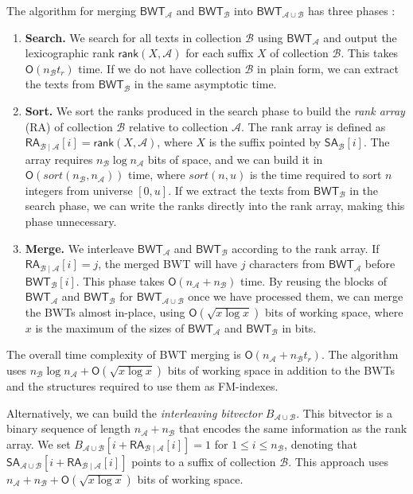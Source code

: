 \documentclass[smallabstract,smallcaptions]{dccpaper}
\newcommand{\Oh}{\ensuremath{\mathsf{O}}}
\newcommand{\BWT}{\textsf{BWT}}
\newcommand{\RA}{\textsf{RA}}
\newcommand{\mSA}{\ensuremath{\mathsf{SA}}}
\newcommand{\mBWT}{\ensuremath{\mathsf{BWT}}}
\newcommand{\mRA}{\ensuremath{\mathsf{RA}}}
\newcommand{\mrank}{\ensuremath{\mathsf{rank}}}
\newcommand{\Acoll}{\ensuremath{\mathcal{A}}}
\newcommand{\Bcoll}{\ensuremath{\mathcal{B}}}
\begin{document}
The algorithm for merging $\mBWT_{\Acoll}$ and $\mBWT_{\Bcoll}$ into $\mBWT_{\Acoll \cup \Bcoll}$ has three phases \cite{Siren2009}:
\begin{enumerate}

\item \textbf{Search.} We search for all texts in collection $\Bcoll$ using $\mBWT_{\Acoll}$ and output the lexicographic rank $\mrank(X, \Acoll)$ for each suffix $X$ of collection $\Bcoll$. This takes $\Oh(n_{\Bcoll} t_{r})$ time. If we do not have collection $\Bcoll$ in plain form, we can extract the texts from $\mBWT_{\Bcoll}$ in the same asymptotic time.

\item \textbf{Sort.} We sort the ranks produced in the search phase to build the \emph{rank array} (\RA) of collection $\Bcoll$ relative to collection $\Acoll$. The rank array is defined as $\mRA_{\Bcoll \mid \Acoll}[i] = \mrank(X, \Acoll)$, where $X$ is the suffix pointed by $\mSA_{\Bcoll}[i]$. The array requires $n_{\Bcoll} \log n_{\Acoll}$ bits of space, and we can build it in $\Oh(sort(n_{\Bcoll}, n_{\Acoll}))$ time, where $sort(n, u)$ is the time required to sort $n$ integers from universe $[0,u]$. If we extract the texts from $\mBWT_{\Bcoll}$ in the search phase, we can write the ranks directly into the rank array, making this phase unnecessary.

\item \textbf{Merge.} We interleave $\mBWT_{\Acoll}$ and $\mBWT_{\Bcoll}$ according to the rank array. If $\mRA_{\Bcoll \mid \Acoll}[i] = j$, the merged \BWT{} will have $j$ characters from $\mBWT_{\Acoll}$ before $\mBWT_{\Bcoll}[i]$. This phase takes $\Oh(n_{\Acoll} + n_{\Bcoll})$ time. By reusing the blocks of $\mBWT_{\Acoll}$ and $\mBWT_{\Bcoll}$ for $\mBWT_{\Acoll \cup \Bcoll}$ once we have processed them, we can merge the \BWT{}s almost in-place, using $\Oh(\sqrt{x \log x})$ bits of working space, where $x$ is the maximum of the sizes of $\mBWT_{\Acoll}$ and $\mBWT_{\Bcoll}$ in bits.

\end{enumerate}
The overall time complexity of \BWT{} merging is $\Oh(n_{\Acoll} + n_{\Bcoll} t_{r})$. The algorithm uses $n_{\Bcoll} \log n_{\Acoll} + \Oh(\sqrt{x \log x})$ bits of working space in addition to the \BWT{}s and the structures required to use them as FM-indexes.

Alternatively, we can build the \emph{interleaving bitvector} $B_{\Acoll \cup \Bcoll}$. This bitvector is a binary sequence of length $n_{\Acoll} + n_{\Bcoll}$ that encodes the same information as the rank array. We set $B_{\Acoll \cup \Bcoll}[i + \mRA_{\Bcoll \mid \Acoll}[i]] = 1$ for $1 \le i \le n_{\Bcoll}$, denoting that $\mSA_{\Acoll \cup \Bcoll}[i + \mRA_{\Bcoll \mid \Acoll}[i]]$ points to a suffix of collection $\Bcoll$. This approach uses $n_{\Acoll} + n_{\Bcoll} + \Oh(\sqrt{x \log x})$ bits of working space.
\end{document}
